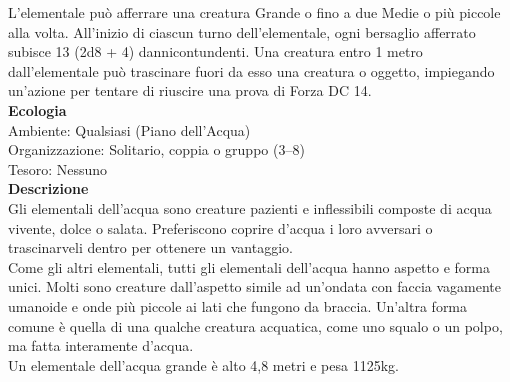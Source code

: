 \begin{multicols}{2}
L'elementale può afferrare una creatura Grande o fino a due Medie o più piccole alla volta. All'inizio di ciascun turno dell'elementale, ogni bersaglio afferrato subisce 13 (2d8 + 4) dannicontundenti. Una creatura entro 1 metro dall'elementale può trascinare fuori da esso una  creatura o oggetto, impiegando un'azione per tentare di riuscire una prova di Forza DC 14.\\
\textbf{Ecologia}\\
Ambiente: Qualsiasi (Piano dell'Acqua)\\
Organizzazione: Solitario, coppia o gruppo (3–8)\\
Tesoro: Nessuno\\
\textbf{Descrizione}\\
Gli elementali dell'acqua sono creature pazienti e inflessibili composte di acqua vivente, dolce o salata. Preferiscono coprire d’acqua i loro avversari o trascinarveli dentro per ottenere un vantaggio.\\
Come gli altri elementali, tutti gli elementali dell'acqua hanno aspetto e forma unici. Molti sono creature dall'aspetto simile ad un’ondata con faccia vagamente umanoide e onde più piccole ai lati che fungono da braccia. Un’altra forma comune è quella di una qualche creatura acquatica, come uno squalo o un polpo, ma fatta interamente d'acqua.\\
Un elementale dell'acqua grande è alto 4,8 metri e pesa 1125kg.\\


\end{multicols}

